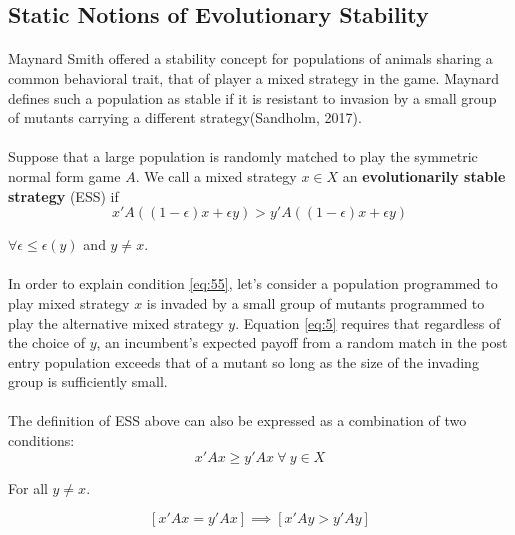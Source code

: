 \subsection{Static Notions of Evolutionary Stability}
\paragraph{}Maynard Smith offered a stability concept for populations of animals sharing a common behavioral trait, that of player a mixed strategy in  the game. Maynard defines such a population as stable if it is resistant to invasion by a small group of mutants carrying a different strategy(Sandholm, 2017).
\paragraph{}Suppose that a large population is randomly matched to play the symmetric normal form game $A$. We call a mixed strategy $x \in X$ an \textbf{evolutionarily stable strategy} (ESS) if 
\begin{equation}\label{eq:55}
x' A((1 - \epsilon)x + \epsilon y) > y' A((1 - \epsilon)x + \epsilon y) 
\end{equation}
\begin{center}
$\forall \epsilon \leq \epsilon(y)$ and $y \neq x.$
\end{center}
\paragraph{}In order to explain condition \ref{eq:55}, let's consider a population programmed to play mixed strategy $x$ is invaded by a small group of mutants programmed to play the alternative mixed strategy $y$. Equation \ref{eq:5} requires that regardless of the choice of $y$, an incumbent's expected payoff from a random match in the post entry population exceeds that of a mutant so long as the size of the invading group is sufficiently small.
\paragraph{}The definition of ESS above can also be expressed as a combination of two conditions: 
\begin{equation}\label{eq:6}
x' A x \geq y' A x  \: \forall  \: y \in X
\end{equation}
\begin{center}
For all $y \neq x.$
\end{center}
\begin{equation}\label{eq:7}
[x' A x = y' A x] \implies [x' A y > y' A y]
\end{equation}
